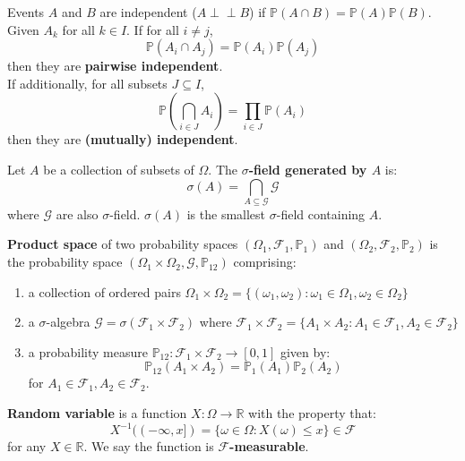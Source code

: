 \documentclass{huhtakm-template-book}
\newcommand{\independent}{\perp\!\!\!\perp}
\newcommand{\prob}{\mathbb{P}}
\begin{document}
\newpage
\begin{sdefn}
	Events $A$ and $B$ are independent ($A\independent B$) if $\prob(A\cap B)=\prob(A)\prob(B)$.\\
	Given $A_{k}$ for all $k\in I$. If for all $i\neq j$, 
	\begin{equation*}
		\prob(A_{i}\cap A_{j})=\prob(A_{i})\prob(A_{j})
	\end{equation*} 
	then they are \textbf{pairwise independent}.\\
	If additionally, for all subsets $J\subseteq I$,
	\begin{equation*}
		\prob\left(\bigcap_{i\in J}A_{i}\right)=\prod_{i\in J}\prob(A_{i})
	\end{equation*}
	then they are \textbf{(mutually) independent}.
\end{sdefn}
\begin{sdefn}
	Let $A$ be a collection of subsets of $\Omega$. The \textbf{$\sigma$-field generated by $A$} is:
	\begin{equation*}
		\sigma(A)=\bigcap_{A\subseteq\mathcal{G}}\mathcal{G}
	\end{equation*}
	where $\mathcal{G}$ are also $\sigma$-field. $\sigma(A)$ is the smallest $\sigma$-field containing $A$.
\end{sdefn}
\begin{sdefn}
	\textbf{Product space} of two probability spaces $(\Omega_{1},\mathcal{F}_{1},\prob_{1})$ and $(\Omega_{2},\mathcal{F}_{2},\prob_{2})$ is the probability space $(\Omega_{1}\times\Omega_{2},\mathcal{G},\prob_{12})$ comprising:
	\begin{enumerate}
		\item a collection of ordered pairs $\Omega_{1}\times\Omega_{2}=\{(\omega_{1},\omega_{2}):\omega_{1}\in\Omega_{1},\omega_{2}\in\Omega_{2}\}$
		\item a $\sigma$-algebra $\mathcal{G}=\sigma(\mathcal{F}_{1}\times\mathcal{F}_{2})$ where $\mathcal{F}_{1}\times\mathcal{F}_{2}=\{A_{1}\times A_{2}:A_{1}\in\mathcal{F}_{1},A_{2}\in\mathcal{F}_{2}\}$ 
		\item a probability measure $\prob_{12}:\mathcal{F}_{1}\times\mathcal{F}_{2}\to [0,1]$ given by:
		\begin{equation*}
			\prob_{12}(A_{1}\times A_{2})=\prob_{1}(A_{1})\prob_{2}(A_{2})
		\end{equation*}
		for $A_{1}\in\mathcal{F}_{1},A_{2}\in\mathcal{F}_{2}$.
	\end{enumerate}
\end{sdefn}
\begin{sdefn}
	\textbf{Random variable} is a function $X:\Omega\to\mathbb{R}$ with the property that:
	\begin{equation*}
		X^{-1}((-\infty,x])=\{\omega\in\Omega:X(\omega)\leq x\}\in\mathcal{F}
	\end{equation*}
	for any $X\in\mathbb{R}$. We say the function is \textbf{$\mathcal{F}$-measurable}.
\end{sdefn}
\end{document}
